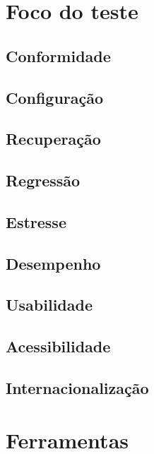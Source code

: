 \documentclass[
	12pt,				%
	openright,			%
	twoside,			%
	a4paper,			%
	english,			%
	brazil,				%
	]{abntex2}
\begin{document}
\section{Foco do teste}


\subsection{Conformidade}


\subsection{Configuração}


\subsection{Recuperação}


\subsection{Regressão}


\subsection{Estresse}


\subsection{Desempenho}


\subsection{Usabilidade}


\subsection{Acessibilidade}


\subsection{Internacionalização}

\section{Ferramentas}
\end{document}
